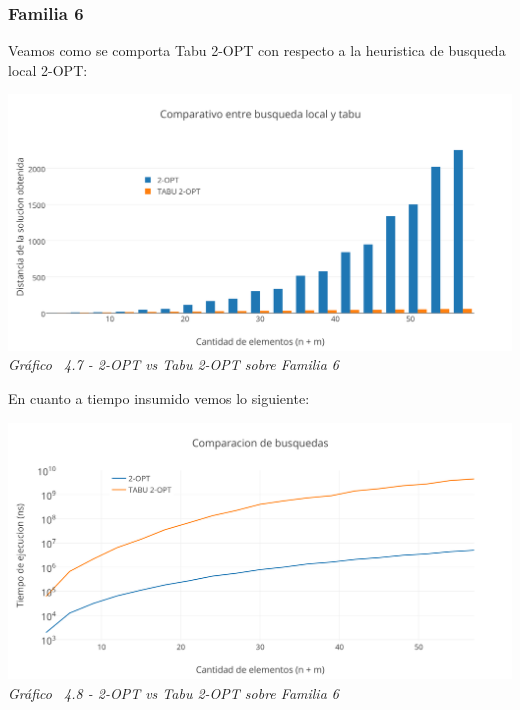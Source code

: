 \subsubsection*{Familia 6}

Veamos como se comporta Tabu 2-OPT con respecto a la heuristica de busqueda local 2-OPT:

\vspace*{0.3cm} \vspace*{0.3cm}
  \begin{center}
 \includegraphics[scale=0.5]{./EJ4/comparativosinorden2opt.png}\\
 {            \textit{Gráfico \ 4.7 - 2-OPT vs Tabu 2-OPT sobre Familia 6}}
  \end{center}
  \vspace*{0.3cm}

En cuanto a tiempo insumido vemos lo siguiente:

\vspace*{0.3cm} \vspace*{0.3cm}
  \begin{center}
 \includegraphics[scale=0.5]{./EJ4/medicion2optsinorden.png}\\
 {            \textit{Gráfico \ 4.8 - 2-OPT vs Tabu 2-OPT sobre Familia 6}}
  \end{center}
  \vspace*{0.3cm}


